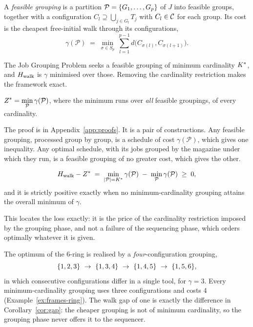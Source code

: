 \begin{definition}\label{def:grouping}
A \emph{feasible grouping} is a partition $\mathcal{P}=\{G_1,\dots,G_p\}$ of $J$
into feasible groups, together with a configuration $C_l\supseteq\bigcup_{j\in G_l}T_j$
with $C_l\in\mathcal{C}$ for each group. Its cost is the cheapest free-initial walk through its
configurations,
\[
  \gamma(\mathcal{P})\;=\;\min_{\sigma\in S_p}\ \sum_{l=1}^{p-1}
  d\bigl(C_{\sigma(l)},C_{\sigma(l+1)}\bigr).
\]
\end{definition}

The Job Grouping Problem seeks a feasible grouping of minimum cardinality $K^{\ast}$,
and $H_{\mathrm{walk}}$ is $\gamma$ minimised over those. Removing the cardinality restriction
makes the framework exact.

\begin{theorem}\label{thm:grouping}
$\displaystyle Z^{\ast}=\min_{\mathcal{P}}\gamma(\mathcal{P})$, where the minimum runs
over \emph{all} feasible groupings, of every cardinality.
\end{theorem}

The proof is in Appendix~\ref{app:proofs}. It is a pair of constructions. Any
feasible grouping, processed group by group, is a schedule of cost
$\gamma(\mathcal{P})$, which gives one inequality. Any optimal schedule, with its
jobs grouped by the magazine under which they run, is a feasible grouping of no
greater cost, which gives the other.

\begin{corollary}\label{cor:gap}
\[
  H_{\mathrm{walk}}-Z^{\ast} \;=\; \min_{\lvert\mathcal{P}\rvert=K^{\ast}}\gamma(\mathcal{P})
  \;-\;\min_{\mathcal{P}}\gamma(\mathcal{P})\;\ge\;0,
\]
and it is strictly positive exactly when no minimum-cardinality grouping attains the
overall minimum of $\gamma$.
\end{corollary}

This locates the loss exactly: it is the price of the cardinality restriction imposed by
the grouping phase, and not a failure of the sequencing phase, which orders optimally
whatever it is given.

\begin{example}\label{ex:ring-why}
The optimum of the $6$-ring is realised by a \emph{four}-configuration grouping,
\[
  \rset{1,2,3}\ \to\ \rset{1,3,4}\ \to\ \rset{1,4,5}\ \to\ \rset{1,5,6},
\]
in which consecutive configurations differ in a single tool, for $\gamma=3$. Every
minimum-cardinality grouping uses three configurations and costs $4$
(Example~\ref{ex:frames-ring}). The walk gap of one is exactly the difference in
Corollary~\ref{cor:gap}: the cheaper grouping is not of minimum cardinality, so the
grouping phase never offers it to the sequencer.
\end{example}

